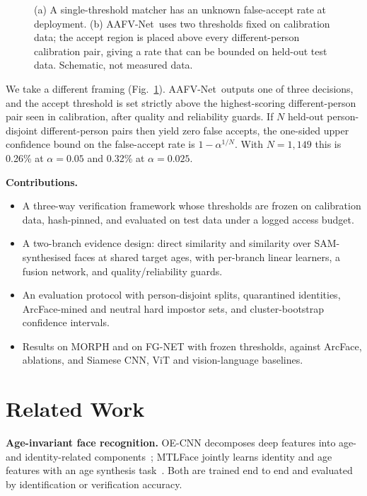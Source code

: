 \documentclass[10pt, a4paper, twocolumn]{article}
\newcommand{\sys}{AAFV-Net}
\begin{document}
\begin{figure}[t]
\centering
{}
\caption{(a) A single-threshold matcher has an unknown false-accept rate at deployment. (b) \sys\ uses two thresholds fixed on calibration data; the accept region is placed above every different-person calibration pair, giving a rate that can be bounded on held-out test data. Schematic, not measured data.}
\label{fig:concept}
\end{figure}

We take a different framing (Fig.~\ref{fig:concept}). \sys\ outputs one of three decisions, and the accept threshold is set strictly above the highest-scoring different-person pair seen in calibration, after quality and reliability guards. If $N$ held-out person-disjoint different-person pairs then yield zero false accepts, the one-sided upper confidence bound on the false-accept rate is $1-\alpha^{1/N}$. With $N=1{,}149$ this is 0.26\% at $\alpha=0.05$ and 0.32\% at $\alpha=0.025$.

\textbf{Contributions.}
\begin{itemize}\itemsep0pt
\item A three-way verification framework whose thresholds are frozen on calibration data, hash-pinned, and evaluated on test data under a logged access budget.
\item A two-branch evidence design: direct similarity and similarity over SAM-synthesised faces at shared target ages, with per-branch linear learners, a fusion network, and quality/reliability guards.
\item An evaluation protocol with person-disjoint splits, quarantined identities, ArcFace-mined and neutral hard impostor sets, and cluster-bootstrap confidence intervals.
\item Results on MORPH and on FG-NET with frozen thresholds, against ArcFace, ablations, and Siamese CNN, ViT and vision-language baselines. 
\end{itemize}

\section{Related Work}
\textbf{Age-invariant face recognition.} OE-CNN decomposes deep features into age- and identity-related components~\cite{wang2018oecnn}; MTLFace jointly learns identity and age features with an age synthesis task~\cite{huang2021mtlface}. Both are trained end to end and evaluated by identification or verification accuracy.
\end{document}

